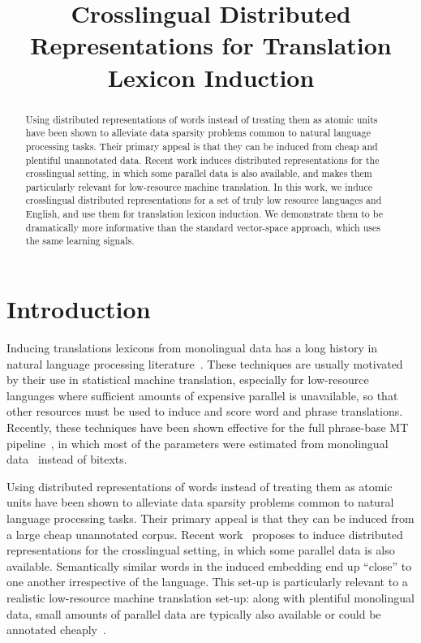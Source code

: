 \documentclass[11pt,letterpaper]{article}
\title{Crosslingual Distributed Representations for Translation Lexicon Induction}
\date{}
\begin{document}
\maketitle
\begin{abstract}
Using distributed representations of words instead of treating them as atomic units have been shown to alleviate data sparsity problems common to natural language processing tasks.  Their primary appeal is that they can be induced from cheap and plentiful unannotated data.  Recent work induces distributed representations for the crosslingual setting, in which some parallel data is also available, and makes them particularly relevant for low-resource machine translation.  In this work, we induce crosslingual distributed representations for a set of truly low resource languages and English, and use them for translation lexicon induction.  We demonstrate them to be dramatically more informative than the standard vector-space approach, which uses the same learning signals.
\end{abstract}

\section{Introduction} \label{sect:intro}
Inducing translations lexicons from monolingual data has a long history in natural language processing literature~\cite{Rapp:1995;Fung:1998;Schafer:2002;Koehn:2002;Garera:2009}.  These techniques are usually motivated by their use in statistical machine translation, especially for low-resource languages where sufficient amounts of expensive parallel is unavailable, so that other resources must be used to induce and score word and phrase translations.  Recently, these techniques have been shown effective for the full phrase-base MT pipeline~\cite{koehn03phrasebased}, in which most of the parameters were estimated from monolingual data~\cite{eacl12} instead of bitexts.

Using distributed representations of words instead of treating them as atomic units have been shown to alleviate data sparsity problems common to natural language processing tasks.  Their primary appeal is that they can be induced from a large cheap unannotated corpus.  Recent work~\cite{Klementiev-et-al:COLING2012} proposes to induce distributed representations for the crosslingual setting, in which some parallel data is also available.  Semantically similar words in the induced embedding end up ``close'' to one another irrespective of the language.  This set-up is particularly relevant to a realistic low-resource machine translation set-up: along with plentiful monolingual data, small amounts of parallel data are typically also available or could be annotated cheaply~\cite{post2012}.
\end{document}
